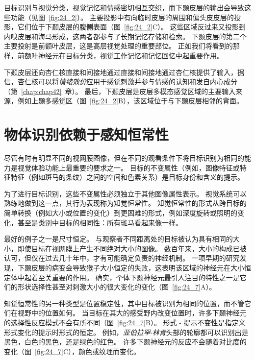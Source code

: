 目标识别与视觉分类，视觉记忆和情感密切相互交织，而下颞皮层的输出会导致这些功能（见图~\ref{fig:24_2}）。
主要投影中有向临时皮层的周围和偏头皮皮层的投影，它们位于下颞皮层的腹侧表面（图~\ref{fig:24_2}C）。
这些区域反过来又投影到内嗅皮层和海马形成，这两者都参与了长期记忆存储和检索。
下颞皮层的第二个主要投射是前额叶皮层，这是高层视觉处理的重要部位。
正如我们将看到的那样，前额叶神经元在目标分类，视觉工作记忆和记忆回忆中起重要作用。


下颞皮层还向杏仁核直接和间接地通过直接和间接地通过杏仁核提供了输入，据信，杏仁核可以将\textit{情绪效价}应用于感觉刺激并参与情感的认知和发自内心成分（第~\ref{chap:chap42}~章）。
最后，下颞皮层是皮层多模态感觉区域的主要输入来源，例如上颞多感觉区（图~\ref{fig:24_2}B），该区域位于与下颞皮层相邻的背面。



\section{物体识别依赖于感知恒常性}

尽管有时有明显不同的视网膜图像，但在不同的观看条件下将目标识别为相同的能力是视觉体验功能上最重要的要求之一。
目标的不变属性（例如，图像特征或特征特征（例如斑马的条纹）之间的空间和色素关系）是目标身份和含义的提示。


为了进行目标识别，这些不变属性必须独立于其他图像属性表示。
视觉系统可以熟练地做到这一点，其行为表现称为知觉恒常性。
知觉恒常性的形式从跨目标的简单转换（例如大小或位置的变化）到更困难的形式，例如深度旋转或照明的变化，甚至是类别中目标的相同性：所有斑马看起来像一样。


最好的例子之一是尺寸恒定。
与观察者不同距离处的目标被认为具有相同的大小，即使目标在视网膜上产生不同绝对大小的图像。
数百年来，大小的构成已被认可，但仅在过去几十年中，才有可能确定负责的神经机制。
一项早期的研究发现，下颞皮层的病变会导致猴子大小恒定的失败，这表明该区域的神经元在大小恒定体中起着至关重要的作用。
确实，个体下颞神经元最引人注目的特性之一是它们的形状选择性甚至对刺激大小的很大变化的变化（图~\ref{fig:24_7}A）。


知觉恒常性的另一种类型是位置稳定性，其中目标被识别为相同的位置，而不管它们在视野中的位置如何。
当目标在其大的感受野内改变位置时，许多下颞神经元的选择性反应模式不会有所不同（图~\ref{fig:24_7}B）。
形式 - 提示不变性是指定义形式变化的提示时形式的恒定。
例如，\textit{亚伯拉罕$\cdot$林肯}头部的轮廓都可以识别出是黑色，白色的黑色，还是绿色的红色。 
许多下颞神经元的反应不会随着对比度的变化（图~\ref{fig:24_7}C），颜色或纹理而变化。


